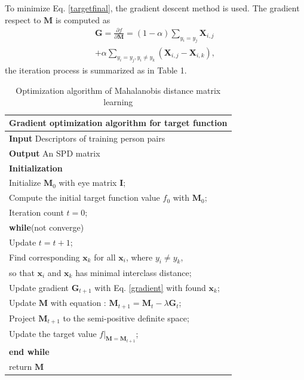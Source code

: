 \documentclass[10pt,twocolumn,letterpaper]{article}
\begin{document}
 To minimize Eq. \eqref{targetfinal}, the gradient descent method is used. The gradient respect to $\bm{M}$ is computed as
 \begin{equation}\label{gradient}
 \begin{aligned}
 \bm{G} =\frac{\partial f}{\partial \bm{M}} = (1-\alpha) \sum_{y_i = y_j} \bm{X}_{i,j} \\
 + \alpha \sum_{y_i = y_j, y_i \ne y_k}(\bm{X}_{i,j} - \bm{X}_{i,k}),
 \end{aligned}
 \end{equation}
the iteration process is summarized as in Table 1.
 \begin{table}[H]
 \centering
 \caption{Optimization algorithm of Mahalanobis distance matrix learning}
 \label{Gradientdemo}
 \begin{tabular}{l}
 \hline 
 \multicolumn{1}{l}{\textbf{Gradient optimization algorithm for target function}} \\
 \hline
 \textbf{Input} Descriptors of training person pairs \\
 \textbf{Output} An SPD matrix\\
 \textbf{Initialization} \\
 Initialize $\bm{M}_0$ with eye matrix $\bm{I}$; \\
 Compute the initial target function value $f_0$ with $\bm{M}_0$;\\
 Iteration count  $t = 0$;\\

 \textbf{while}(not converge)\\
 \hspace{0.5cm} Update $t =  t + 1$;\\
 \hspace{0.5cm}  Find corresponding $\bm{x}_k$ for all $\bm{x}_i$, where $y_i \ne y_k$,  \\ \hspace{0.5cm} so that $\bm{x}_i$ and $\bm{x}_k$ has minimal interclass distance;\\
 \hspace{0.5cm} Update gradient $\bm{G}_{t+1}$ with Eq. \eqref{gradient} with found $\bm{x}_k$;\\
 \hspace{0.5cm}  Update $\bm{M}$ with equation : $\bm{M}_{t+1} = \bm{M}_{t} - \lambda\bm{G}_t$;\\
 \hspace{0.5cm}  Project $\bm{M}_{t+1}$ to the semi-positive definite space; \\ 
 \hspace{0.5cm}  Update the target value $f|_{\bm{M} = \bm{M}_{t+1}}$;\\
 \textbf{end while}  \\
 return $\bm{M}$\\
 \hline
 \end{tabular} 
 \end{table}
 
\end{document}
